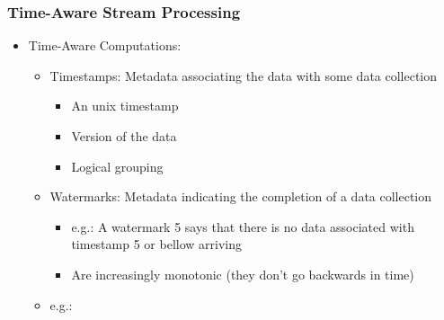 \documentclass[aspectratio=169,10pt]{beamer}
\begin{document}
\begin{frame}[fragile]
  \frametitle{Time-Aware Stream Processing}
  \begin{itemize}
    \item Time-Aware Computations:
          \begin{itemize}
            \item Timestamps: Metadata associating the data with some data collection
                  \begin{itemize}
                    \item An unix timestamp
                    \item Version of the data
                    \item Logical grouping
                  \end{itemize}
            \item Watermarks: Metadata indicating the completion of a data collection
                  \begin{itemize}
                    \item e.g.: A watermark 5 says that there is no data associated with timestamp 5 or bellow arriving
                    \item Are increasingly monotonic (they don't go backwards in time)
                  \end{itemize}
            \item e.g.:
  \begin{figure}[!t]
      \raggedright
    \end{figure}
          \end{itemize}
  \end{itemize}
\end{frame}
\end{document}
